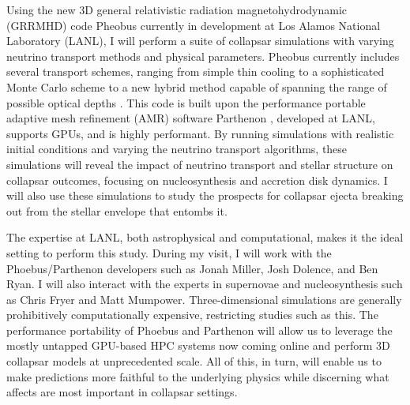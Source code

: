 \documentclass[12pt]{article}
\begin{document}
Using the new 3D general relativistic radiation magnetohydrodynamic (GRRMHD) code Pheobus currently in development at Los Alamos National Laboratory (LANL), I will  perform a suite of collapsar simulations with varying neutrino transport methods and physical parameters.
Pheobus currently includes several transport schemes, ranging from simple thin cooling to a sophisticated Monte Carlo scheme \citep{nubhlight} to a new hybrid method capable of spanning the range of possible optical depths \citep{MOCMC}.
This code is built upon the performance portable adaptive mesh refinement (AMR) software Parthenon \citep{grete:2022}, developed at LANL, supports GPUs, and is highly performant.
By running simulations with realistic initial conditions and varying the neutrino transport algorithms, these simulations will
reveal the impact of neutrino transport and stellar structure on collapsar outcomes, focusing on nucleosynthesis and accretion disk dynamics.
I will also use these simulations to study the prospects for collapsar ejecta breaking out from the stellar envelope that entombs it.

The expertise at LANL, both astrophysical and computational, makes it the ideal setting to perform this study. 
During my visit, I will work with the Phoebus/Parthenon developers such as Jonah Miller, Josh Dolence, and Ben Ryan. I will also interact with the experts in supernovae and nucleosynthesis such as Chris Fryer and Matt Mumpower.
Three-dimensional simulations are generally prohibitively computationally expensive, restricting studies such as this.
The performance portability of Phoebus and Parthenon will allow us to leverage the mostly untapped GPU-based HPC systems now coming online and perform 3D collapsar models at unprecedented scale.
All of this, in turn, will enable us to make predictions more faithful to the underlying physics while discerning what affects are most important in collapsar settings.
\end{document}

